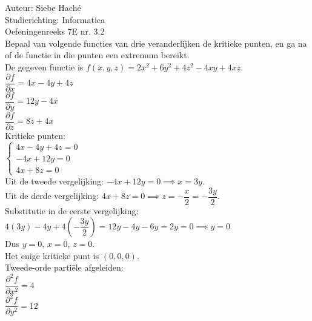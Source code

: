 \documentclass[a4paper]{article}
\begin{document}
\noindent \large Auteur: Siebe Haché \\
\noindent \large Studierichting: Informatica \\
\noindent \large Oefeningenreeks 7E nr. 3.2 \\
\medskip
\normalsize
Bepaal van volgende functies van drie veranderlijken de kritieke punten, en ga na of de functie in die punten een extremum bereikt.\\

De gegeven functie is $f(x,y,z) = 2x^{2} + 6y^{2} + 4z^{2} - 4xy + 4xz$.\\

$\dfrac{\partial f}{\partial x} = 4x - 4y + 4z$\\

$\dfrac{\partial f}{\partial y} = 12y - 4x$\\

$\dfrac{\partial f}{\partial z} = 8z + 4x$\\

Kritieke punten:\\

$\left\{ \begin{array}{l}
4x - 4y + 4z = 0 \\
-4x + 12y = 0 \\
4x + 8z = 0
\end{array} \right.$\\

Uit de tweede vergelijking: $-4x + 12y = 0 \implies x = 3y$.\\

Uit de derde vergelijking: $4x + 8z = 0 \implies z = -\dfrac{x}{2} = -\dfrac{3y}{2}$.\\

Substitutie in de eerste vergelijking:\\

$4(3y) - 4y + 4\left(-\dfrac{3y}{2}\right) = 12y - 4y - 6y = 2y = 0 \implies y = 0$\\

Dus $y = 0$, $x = 0$, $z = 0$.\\

Het enige kritieke punt is $(0, 0, 0)$.\\

Tweede-orde partiële afgeleiden:\\

$\dfrac{\partial^{2} f}{\partial x^{2}} = 4$\\

$\dfrac{\partial^{2} f}{\partial y^{2}} = 12$\\ 
\end{document}
